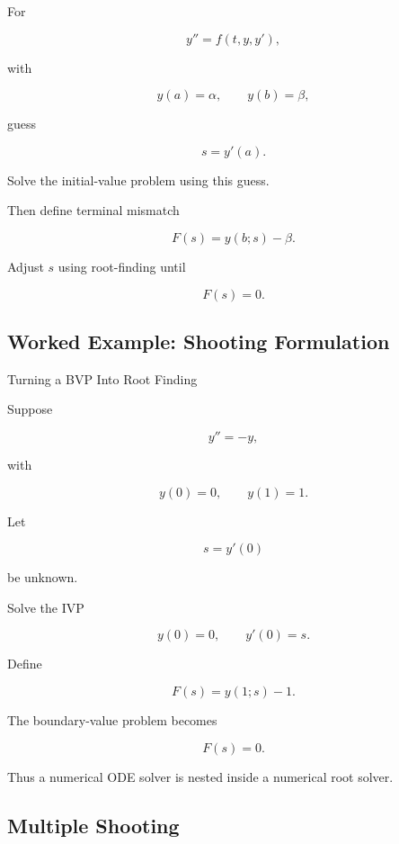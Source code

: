 For

\[
y''=f(t,y,y'),
\]

with

\[
y(a)=\alpha,
\qquad
y(b)=\beta,
\]

guess

\[
\boxed{
s=y'(a).
}
\]

Solve the initial-value problem using this guess.

Then define terminal mismatch

\[
\boxed{
F(s)
=
y(b;s)-\beta.
}
\]

Adjust \(s\) using root-finding until

\[
\boxed{
F(s)=0.
}
\]

\subsection{Worked Example: Shooting Formulation}
\label{subsec:worked-shooting-formulation}

\begin{workedexamplebox}{Turning a BVP Into Root Finding}

Suppose

\[
y''=-y,
\]

with

\[
y(0)=0,
\qquad
y(1)=1.
\]

Let

\[
s=y'(0)
\]

be unknown.

Solve the IVP

\[
y(0)=0,
\qquad
y'(0)=s.
\]

Define

\[
F(s)
=
y(1;s)-1.
\]

The boundary-value problem becomes

\[
\boxed{
F(s)=0.
}
\]

Thus a numerical ODE solver is nested inside a numerical root solver.

\end{workedexamplebox}

\subsection{Multiple Shooting}
\label{subsec:ode-multiple-shooting}


